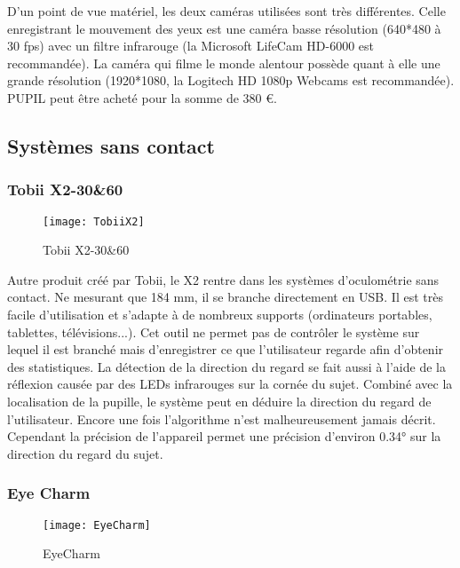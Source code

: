 D’un point de vue matériel, les deux caméras utilisées sont très différentes.
Celle enregistrant le mouvement des yeux est une caméra basse résolution (640*480 à 30 fps) avec un filtre infrarouge (la  Microsoft LifeCam HD-6000 est recommandée). La caméra qui filme le monde alentour possède quant à elle une grande résolution (1920*1080, la Logitech HD 1080p Webcams est recommandée).
PUPIL peut être acheté pour la somme de 380 \euro{}.

\subsection{Systèmes sans contact}

\subsubsection{Tobii X2-30\&60}

\begin{figure}[h]
  \centering
  \texttt{[image: TobiiX2]}
  \caption{Tobii X2-30\&60}
  \label{fig:TobiiX2}
\end{figure}

Autre produit créé par Tobii, le X2 \cite{tobiieyetracker} rentre dans les systèmes d’oculométrie sans contact. Ne mesurant que 184 mm, il se branche directement en USB. Il est très facile d’utilisation et s'adapte à de nombreux supports (ordinateurs portables, tablettes, télévisions...).
Cet outil ne permet pas de contrôler le système sur lequel il est branché mais d’enregistrer ce que l’utilisateur regarde afin d’obtenir des statistiques.
La détection de la direction du regard se fait aussi à l’aide de la réflexion causée par des LEDs infrarouges sur la cornée du sujet. Combiné avec la localisation de la pupille, le système peut en déduire la direction du regard de l’utilisateur. Encore une fois l’algorithme n’est malheureusement jamais décrit. Cependant la précision de l’appareil permet une précision d’environ 0.34° sur la direction du regard du sujet. 

\subsubsection{Eye Charm}

\begin{figure}[h]
  \centering
  \texttt{[image: EyeCharm]}
  \caption{EyeCharm}
  \label{fig:EyeCharm}
\end{figure}

